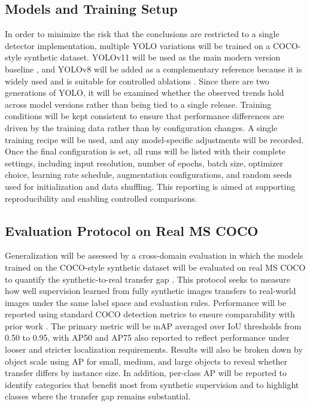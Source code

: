 \documentclass[conference]{IEEEtran}
\begin{document}
\subsection{Models and Training Setup}
In order to minimize the risk that the conclusions are restricted to a single detector implementation, multiple YOLO variations will be trained on a COCO-style synthetic dataset. YOLOv11 will be used as the main modern version baseline \cite{yolo11_ultralytics}, and YOLOv8 will be added as a complementary reference because it is widely used and is suitable for controlled ablations \cite{yolov8_ultralytics}. Since there are two generations of YOLO, it will be examined whether the observed trends hold across model versions rather than being tied to a single release. Training conditions will be kept consistent to ensure that performance differences are driven by the training data rather than by configuration changes. A single training recipe will be used, and any model-specific adjustments will be recorded. Once the final configuration is set, all runs will be listed with their complete settings, including input resolution, number of epochs, batch size, optimizer choice, learning rate schedule, augmentation configurations, and random seeds used for initialization and data shuffling. This reporting is aimed at supporting reproducibility and enabling controlled comparisons.

\subsection{Evaluation Protocol on Real MS COCO}
Generalization will be assessed by a cross-domain evaluation in which the models trained on the COCO-style synthetic dataset will be evaluated on real MS COCO to quantify the synthetic-to-real transfer gap \cite{lin2014microsoftcoco}. This protocol seeks to measure how well supervision learned from fully synthetic images transfers to real-world images under the same label space and evaluation rules. Performance will be reported using standard COCO detection metrics to ensure comparability with prior work \cite{lin2014microsoftcoco}. The primary metric will be mAP averaged over IoU thresholds from 0.50 to 0.95, with AP50 and AP75 also reported to reflect performance under looser and stricter localization requirements. Results will also be broken down by object scale using AP for small, medium, and large objects to reveal whether transfer differs by instance size. In addition, per-class AP will be reported to identify categories that benefit most from synthetic supervision and to highlight classes where the transfer gap remains substantial.
\end{document}
